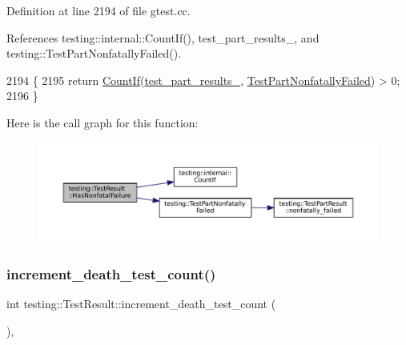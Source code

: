 Definition at line 2194 of file gtest.\+cc.



References testing\+::internal\+::\+Count\+If(), test\+\_\+part\+\_\+results\+\_\+, and testing\+::\+Test\+Part\+Nonfatally\+Failed().


\begin{DoxyCode}
2194                                           \{
2195   \textcolor{keywordflow}{return} \hyperlink{namespacetesting_1_1internal_a1e77a774d910346eff11a86d8df783a5}{CountIf}(\hyperlink{classtesting_1_1TestResult_af17c00fae1435d344b318eb6bbb56cff}{test\_part\_results\_}, 
      \hyperlink{namespacetesting_af256d104ca665115eb291f762bb659e3}{TestPartNonfatallyFailed}) > 0;
2196 \}
\end{DoxyCode}
Here is the call graph for this function\+:
\nopagebreak
\begin{figure}[H]
\begin{center}
\leavevmode
\includegraphics[width=350pt]{classtesting_1_1TestResult_a510564fa67b485ed4589a259f2a032d6_cgraph}
\end{center}
\end{figure}
\mbox{\label{classtesting_1_1TestResult_a07faaa1d16a991f34222d02e10c75dc2}} 
\subsubsection{\texorpdfstring{increment\+\_\+death\+\_\+test\+\_\+count()}{increment\_death\_test\_count()}}
{\footnotesize\ttfamily int testing\+::\+Test\+Result\+::increment\+\_\+death\+\_\+test\+\_\+count (\begin{DoxyParamCaption}{ }\end{DoxyParamCaption})\hspace{0.3cm}{\ttfamily [inline]}, {\ttfamily [private]}}



